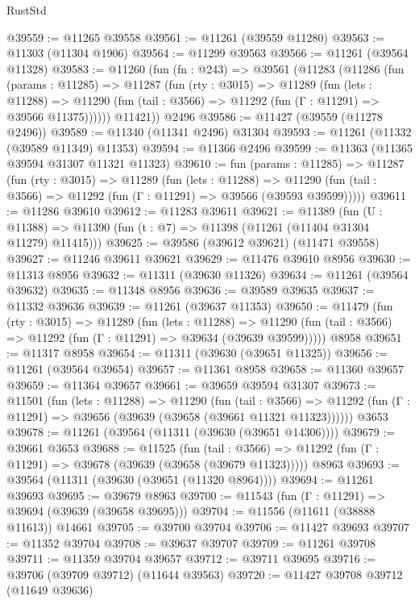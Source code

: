 \begin{lexlean}{RustStd}
\begin{coremodule}
@39559 := @11265 @39558
@39561 := @11261 (@39559 @11280)
@39563 := @11303 (@11304 @1906)
@39564 := @11299 @39563
@39566 := @11261 (@39564 @11328)
@39583 := @11260
    (fun (fn : @243) =>
    @39561
      (@11283
        (@11286
          (fun (params : @11285) =>
          @11287
            (fun (rty : @3015) =>
            @11289
              (fun (lets : @11288) =>
              @11290 (fun (tail : @3566) => @11292 (fun (Γ : @11291) => @39566 @11375))))))
        @11421))
    @2496
@39586 := @11427 (@39559 (@11278 @2496))
@39589 := @11340 (@11341 @2496) @31304
@39593 := @11261 (@11332 (@39589 @11349) @11353)
@39594 := @11366 @2496
@39599 := @11363 (@11365 @39594 @31307 @11321 @11323)
@39610 := fun (params : @11285) =>
  @11287
    (fun (rty : @3015) =>
    @11289
      (fun (lets : @11288) =>
      @11290 (fun (tail : @3566) => @11292 (fun (Γ : @11291) => @39566 (@39593 @39599)))))
@39611 := @11286 @39610
@39612 := @11283 @39611
@39621 := @11389
    (fun (U : @11388) => @11390 (fun (t : @7) => @11398 (@11261 (@11404 @31304 @11279) @11415)))
@39625 := @39586 (@39612 @39621) (@11471 @39558)
@39627 := @11246 @39611 @39621
@39629 := @11476 @39610 @8956
@39630 := @11313 @8956
@39632 := @11311 (@39630 @11326)
@39634 := @11261 (@39564 @39632)
@39635 := @11348 @8956
@39636 := @39589 @39635
@39637 := @11332 @39636
@39639 := @11261 (@39637 @11353)
@39650 := @11479
    (fun (rty : @3015) =>
    @11289
      (fun (lets : @11288) =>
      @11290 (fun (tail : @3566) => @11292 (fun (Γ : @11291) => @39634 (@39639 @39599)))))
    @8958
@39651 := @11317 @8958
@39654 := @11311 (@39630 (@39651 @11325))
@39656 := @11261 (@39564 @39654)
@39657 := @11361 @8958
@39658 := @11360 @39657
@39659 := @11364 @39657
@39661 := @39659 @39594 @31307
@39673 := @11501
    (fun (lets : @11288) =>
    @11290
      (fun (tail : @3566) =>
      @11292 (fun (Γ : @11291) => @39656 (@39639 (@39658 (@39661 @11321 @11323))))))
    @3653
@39678 := @11261 (@39564 (@11311 (@39630 (@39651 @14306))))
@39679 := @39661 @3653
@39688 := @11525
    (fun (tail : @3566) => @11292 (fun (Γ : @11291) => @39678 (@39639 (@39658 (@39679 @11323)))))
    @8963
@39693 := @39564 (@11311 (@39630 (@39651 (@11320 @8964))))
@39694 := @11261 @39693
@39695 := @39679 @8963
@39700 := @11543 (fun (Γ : @11291) => @39694 (@39639 (@39658 @39695)))
@39704 := @11556 (@11611 (@38888 @11613)) @14661
@39705 := @39700 @39704
@39706 := @11427 @39693
@39707 := @11352 @39704
@39708 := @39637 @39707
@39709 := @11261 @39708
@39711 := @11359 @39704 @39657
@39712 := @39711 @39695
@39716 := @39706 (@39709 @39712) (@11644 @39563)
@39720 := @11427 @39708 @39712 (@11649 @39636)

\end{coremodule}
\end{lexlean}
